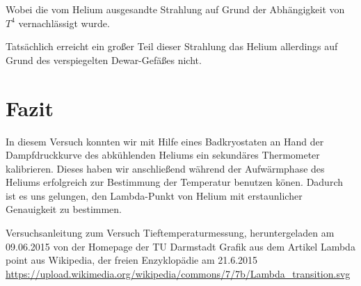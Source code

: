 \documentclass[bigchapter,colorback,accentcolor=tud4b,linedtoc,11pt]{tudreport}
\begin{document}
Wobei die vom Helium ausgesandte Strahlung auf Grund der Abhängigkeit von $T^4$
vernachlässigt wurde.

Tatsächlich erreicht ein großer Teil dieser Strahlung das Helium allerdings auf
Grund des verspiegelten Dewar-Gefäßes nicht.

\chapter{Fazit}
In diesem Versuch konnten wir mit Hilfe eines Badkryostaten an Hand der
Dampfdruckkurve des abkühlenden Heliums ein sekundäres Thermometer kalibrieren. Dieses haben
wir anschließend während der Aufwärmphase des Heliums erfolgreich zur Bestimmung
der Temperatur benutzen könen. Dadurch ist es uns gelungen, den
Lambda-Punkt von Helium mit erstaunlicher Genauigkeit zu bestimmen.
\cleardoublepage{}
\newpage
\begin{thebibliography}{100}
   Versuchsanleitung zum Versuch Tieftemperaturmessung, heruntergeladen am 09.06.2015 von der Homepage der TU Darmstadt
   Grafik aus dem Artikel Lambda point aus Wikipedia, der freien Enzyklopädie am 21.6.2015 \url{https://upload.wikimedia.org/wikipedia/commons/7/7b/Lambda_transition.svg}
  
\end{thebibliography}
\end{document}
